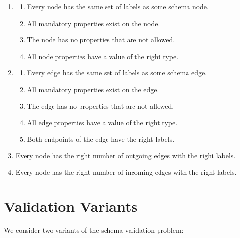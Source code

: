 \documentclass{report}
\theoremstyle{definition}
\begin{document}
\begin{enumerate}
  \item
        \begin{enumerate}
          \item\label{rule:simp-node-labels}
                Every node has the same set of labels as some schema node.
          \item\label{rule:simp-node-mandatory-props}
                All mandatory properties exist on the node.
          \item\label{rule:simp-node-allowed-props}
                The node has no properties that are not allowed.
          \item\label{rule:simp-node-datatype}
                All node properties have a value of the right type.
        \end{enumerate}
  \item
        \begin{enumerate}
          \item\label{rule:simp-edge-labels}
                Every edge has the same set of labels as some schema edge.
          \item\label{rule:simp-edge-mandatory-props}
                All mandatory properties exist on the edge.
          \item\label{rule:simp-edge-allowed-props}
                The edge has no properties that are not allowed.
          \item\label{rule:simp-edge-datatype}
                All edge properties have a value of the right type.
          \item\label{rule:simp-edge-endpoints}
                Both endpoints of the edge have the right labels.
        \end{enumerate}
  \item\label{rule:simp-card-out}
        Every node has the right number of outgoing edges with the right labels.
  \item\label{rule:simp-card-in}
        Every node has the right number of incoming edges with the right labels.
\end{enumerate}

\section{Validation Variants}
\label{sec:variants}

We consider two variants of the schema validation problem:
\end{document}
